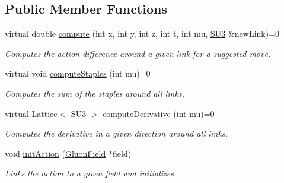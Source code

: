 \subsection*{Public Member Functions}
\begin{DoxyCompactItemize}
\item 
virtual double \hyperlink{classAction_ac0ea0d66e3ee4c7bdf0b478e613e5981}{compute} (int x, int y, int z, int t, int mu, \hyperlink{structSU3}{S\+U3} \&new\+Link)=0\hypertarget{classAction_ac0ea0d66e3ee4c7bdf0b478e613e5981}{}\label{classAction_ac0ea0d66e3ee4c7bdf0b478e613e5981}

\begin{DoxyCompactList}\small\item\em Computes the action difference around a given link for a suggested move. \end{DoxyCompactList}\item 
virtual void \hyperlink{classAction_ad6c5003169695d5cba0f69580040db50}{compute\+Staples} (int mu)=0\hypertarget{classAction_ad6c5003169695d5cba0f69580040db50}{}\label{classAction_ad6c5003169695d5cba0f69580040db50}

\begin{DoxyCompactList}\small\item\em Computes the sum of the staples around all links. \end{DoxyCompactList}\item 
virtual \hyperlink{classLattice}{Lattice}$<$ \hyperlink{structSU3}{S\+U3} $>$ \hyperlink{classAction_a722e4f88dda82440d0c6e19a43972b21}{compute\+Derivative} (int mu)=0\hypertarget{classAction_a722e4f88dda82440d0c6e19a43972b21}{}\label{classAction_a722e4f88dda82440d0c6e19a43972b21}

\begin{DoxyCompactList}\small\item\em Computes the derivative in a given direction around all links. \end{DoxyCompactList}\item 
void \hyperlink{classAction_a3c4e7cbcf64ae134fa86afd5d156b12b}{init\+Action} (\hyperlink{classField}{Gluon\+Field} $\ast$field)
\begin{DoxyCompactList}\small\item\em Links the action to a given field and initializes. \end{DoxyCompactList}\end{DoxyCompactItemize}
